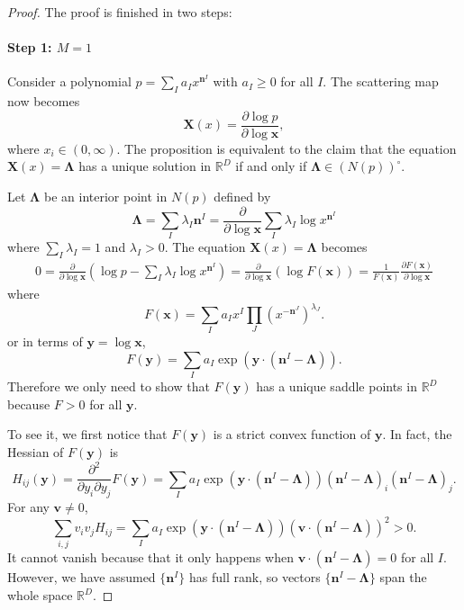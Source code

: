 \documentclass[12pt]{article}
\theoremstyle{definition}
\theoremstyle{plain}
\begin{document}
\begin{proof}
The proof is finished in two steps:
\paragraph{Step 1: $M=1$}
Consider a polynomial $p=\sum_{I} a_I x^{\mathbf n^I}$ with $a_I\geq 0$ for all $I$. 
The scattering map now becomes
\[
	\mathbf X(x)=\frac{\partial \log p}{\partial \log \mathbf x},
\]
where $x_i\in (0,\infty)$. The proposition is equivalent to the claim 
that the equation $\mathbf X(x)=\mathbf\Lambda$ has a unique solution in $\mathbb R^D$ 
if and only if $\mathbf\Lambda\in (N(p))^\circ$. 

Let $\mathbf{\Lambda}$ be an interior point in $N(p)$ defined by 
\[
	\mathbf \Lambda=\sum_{I}\lambda_I\mathbf n^I
	=\frac{\partial}{\partial \log \mathbf x}\sum_{I}\lambda_I \log x^{\mathbf n^I}
\]
where $\sum_I \lambda_I=1$ and $\lambda_I > 0$. The equation $\mathbf X(x)=\mathbf \Lambda$ becomes
\[
\begin{aligned}
	0=\frac{\partial }{\partial \log \mathbf x}\left(
		\log p-\sum_{I}\lambda_I \log x^{\mathbf n^I}
	\right)=\frac{\partial }{\partial \log \mathbf x}\left(
	\log F(\mathbf x)
	\right)=\frac{1}{F(\mathbf x)}\frac{\partial F(\mathbf x)}{\partial \log \mathbf x}
\end{aligned}
\]
where
\[
	F(\mathbf x)=\sum_I a_I x^I\prod_J (x^{-\mathbf n^J})^{\lambda_J}.
\]
or in terms of $\mathbf y=\log \mathbf x$, 
\[
	F(\mathbf y)
	=\sum_I a_I \exp\left(\mathbf{y}\cdot \left(\mathbf{n}^I-\mathbf{\Lambda}\right)\right).
\]
Therefore we only need to show that $F(\mathbf y)$ has a unique saddle points in $\mathbb R^D$ 
because $F>0$ for all $\mathbf y$.

To see it, we first notice that $F(\mathbf y)$ is a strict convex function of $\mathbf y$. In fact, the Hessian of $F(\mathbf y)$ is 
\[
	H_{ij}(\mathbf y)=\frac{\partial^2}{\partial y_i\partial y_j}F(\mathbf y)=\sum_I a_I \exp\left(\mathbf{y}\cdot \left(\mathbf{n}^I-\mathbf{\Lambda}\right)\right)\left(\mathbf{n}^I-\mathbf{\Lambda}\right)_i\left(\mathbf{n}^I-\mathbf{\Lambda}\right)_j.
\]
For any $\mathbf v\neq 0$, 
\[
	\sum_{i,j}v_iv_jH_{ij}=\sum_I a_I \exp\left(\mathbf{y}\cdot \left(\mathbf{n}^I-\mathbf{\Lambda}\right)\right) \left(\mathbf v\cdot (\mathbf{n}^I-\mathbf{\Lambda})\right)^2 >0.
\]
It cannot vanish because that it only happens when $\mathbf v\cdot (\mathbf{n}^I-\mathbf{\Lambda})=0$ 
for all $I$. However, we have assumed $\{\mathbf n^I\}$ has full rank, so
vectors $\{\mathbf{n}^I-\mathbf{\Lambda}\}$ span the whole space 
$\mathbb R^D$. 


\end{proof}
\end{document}
